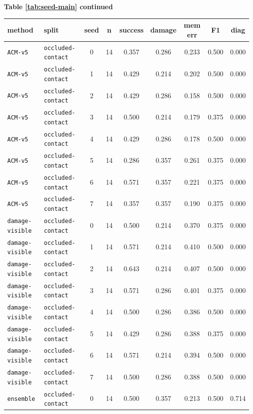\documentclass{article}
\begin{document}
\begin{center}
\textbf{Table \ref{tab:seed-main} continued}\\[0.4ex]
\begin{tabular}{llccccccc}
\toprule
method & split & seed & n & success & damage & mem err & F1 & diag \\
\midrule
\texttt{ACM-v5} & \texttt{occluded-contact} & 0 & 14 & 0.357 & 0.286 & 0.233 & 0.500 & 0.000 \\
\texttt{ACM-v5} & \texttt{occluded-contact} & 1 & 14 & 0.429 & 0.214 & 0.202 & 0.500 & 0.000 \\
\texttt{ACM-v5} & \texttt{occluded-contact} & 2 & 14 & 0.429 & 0.286 & 0.158 & 0.500 & 0.000 \\
\texttt{ACM-v5} & \texttt{occluded-contact} & 3 & 14 & 0.500 & 0.214 & 0.179 & 0.375 & 0.000 \\
\texttt{ACM-v5} & \texttt{occluded-contact} & 4 & 14 & 0.429 & 0.286 & 0.178 & 0.500 & 0.000 \\
\texttt{ACM-v5} & \texttt{occluded-contact} & 5 & 14 & 0.286 & 0.357 & 0.261 & 0.375 & 0.000 \\
\texttt{ACM-v5} & \texttt{occluded-contact} & 6 & 14 & 0.571 & 0.357 & 0.221 & 0.375 & 0.000 \\
\texttt{ACM-v5} & \texttt{occluded-contact} & 7 & 14 & 0.357 & 0.357 & 0.190 & 0.375 & 0.000 \\
\texttt{damage-visible} & \texttt{occluded-contact} & 0 & 14 & 0.500 & 0.214 & 0.370 & 0.375 & 0.000 \\
\texttt{damage-visible} & \texttt{occluded-contact} & 1 & 14 & 0.571 & 0.214 & 0.410 & 0.500 & 0.000 \\
\texttt{damage-visible} & \texttt{occluded-contact} & 2 & 14 & 0.643 & 0.214 & 0.407 & 0.500 & 0.000 \\
\texttt{damage-visible} & \texttt{occluded-contact} & 3 & 14 & 0.571 & 0.286 & 0.401 & 0.375 & 0.000 \\
\texttt{damage-visible} & \texttt{occluded-contact} & 4 & 14 & 0.500 & 0.286 & 0.386 & 0.500 & 0.000 \\
\texttt{damage-visible} & \texttt{occluded-contact} & 5 & 14 & 0.429 & 0.286 & 0.388 & 0.375 & 0.000 \\
\texttt{damage-visible} & \texttt{occluded-contact} & 6 & 14 & 0.571 & 0.214 & 0.394 & 0.500 & 0.000 \\
\texttt{damage-visible} & \texttt{occluded-contact} & 7 & 14 & 0.500 & 0.286 & 0.388 & 0.500 & 0.000 \\
\texttt{ensemble} & \texttt{occluded-contact} & 0 & 14 & 0.500 & 0.357 & 0.213 & 0.500 & 0.714 \\

\end{tabular}
\end{center}
\end{document}
